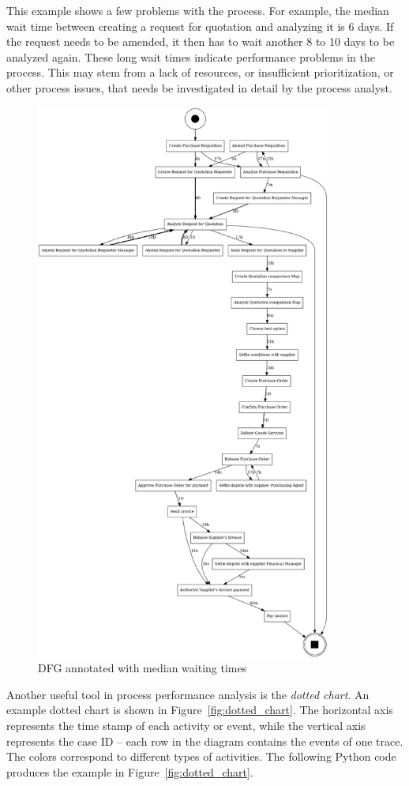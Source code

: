 This example shows a few problems with the process. For example, the median wait time between creating a request for quotation and analyzing it is 6 days. If the request needs to be amended, it then has to wait another 8 to 10 days to be analyzed again. These long wait times indicate performance problems in the process. This may stem from a lack of resources, or insufficient prioritization, or other process issues, that needs be investigated in detail by the process analyst. 

\begin{figure}
\centering

\includegraphics[height=7.25in]{perfdfg.png}
\caption{DFG annotated with median waiting times}
\label{fig:performance_dfg}
\end{figure}

Another useful tool in process performance analysis is the \emph{dotted chart}. An example dotted chart is shown in Figure~\ref{fig:dotted_chart}. The horizontal axis represents the time stamp of each activity or event, while the vertical axis represents the case ID -- each row in the diagram contains the events of one trace. The colors correspond to different types of activities. The following Python code produces the example in Figure~\ref{fig:dotted_chart}.

